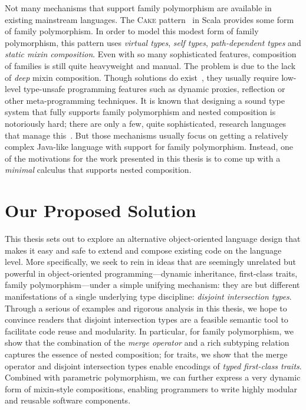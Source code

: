 Not many mechanisms that support family polymorphism are available in existing
mainstream languages. The \textsc{Cake} pattern~\citep{odersky2005scalable,
  Zenger-Odersky2005} in Scala provides some form of family polymorphism. In
order to model this modest form of family polymorphism, this pattern uses
\emph{virtual types}, \emph{self types}, \emph{path-dependent types} and
\emph{static mixin composition}. Even with so many sophisticated features,
composition of families is still quite heavyweight and manual. The problem is
due to the lack of \emph{deep} mixin composition. Though solutions do
exist~\citep{oliveira2013feature}, they usually require low-level type-unsafe
programming features such as dynamic proxies, reflection or other
meta-programming techniques. It is known that designing a sound type system that
fully supports family polymorphism and nested composition is notoriously hard;
there are only a few, quite sophisticated, research languages that manage
this~\citep{ErnstVirtual, Nystrom_2004, pubsdoc:tribe-virtual-calculus,SAITO_2007}.
But those mechanisms usually focus
on getting a relatively complex Java-like language with support for family polymorphism. Instead, one
of the motivations for the work presented in this thesis is to come up with a \textit{minimal} calculus that
supports nested composition.



\section{Our Proposed Solution}

This thesis sets out to explore an alternative object-oriented language design
that makes it easy and safe to extend and compose existing code on the
language level. More specifically, we seek to rein in ideas that are seemingly
unrelated but powerful in object-oriented programming---dynamic inheritance,
first-class traits, family polymorphism---under a simple unifying mechanism:
they are but different manifestations of a single underlying type discipline:
\emph{disjoint intersection types}. Through a serious of examples and rigorous
analysis in this thesis, we hope to convince readers that disjoint intersection
types are a feasible semantic tool to facilitate code reuse and modularity. In
particular, for family polymorphism, we show that the combination of the
\emph{merge operator} and a rich subtyping relation captures the essence of
nested composition; for traits, we show that the merge operator and
disjoint intersection types enable encodings of \emph{typed first-class traits}.
Combined with parametric polymorphism, we can further
express a very dynamic form of mixin-style compositions, enabling programmers to write highly
modular and reusable software components.

